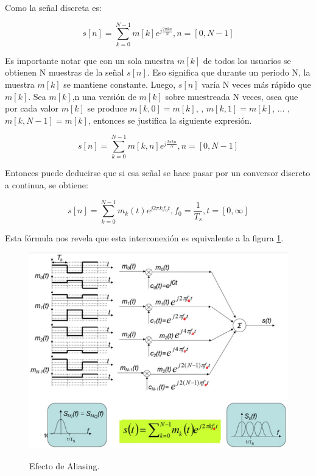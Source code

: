 Como la señal discreta es:

\begin{equation} \label{capseis_trece}
s[n]= \sum_{k=0}^{N-1}m[k]e^{j \frac{2 \pi kn}{N}} ,n=[0, N-1]
\end{equation}

Es importante notar que con un sola muestra $m[k]$ de todos los usuarios se obtienen N muestras de la señal $s[n]$. Eso significa que durante un periodo N, la muestra $m[k]$ se mantiene constante. Luego, $s[n]$ varía N veces más rápido que $m[k]$. Sea $m[k]$,n una versión de $m[k]$ sobre muestreada N veces, osea que por cada valor $m[k]$ se produce $m[k,0]=m[k]$, , $m[k,1]=m[k]$,  ... , $m[k,N-1]=m[k]$, entonces se justifica la siguiente expresión.

\begin{equation} \label{capseis_catorce}
s[n]= \sum_{k=0}^{N-1}m[k,n]e^{j \frac{2 \pi kn}{N}} ,n=[0, N-1]
\end{equation}

Entonces puede deducirse que si esa señal se hace pasar por un conversor discreto a continua, se obtiene:

\begin{equation} \label{capseis_quince}
s[n]= \sum_{k=0}^{N-1}m_{k}(t)e^{j2\pi kf_{0}t} , f_{0}= \frac{1}{T_{s}}, t= [0, \infty]
\end{equation}

Esta fórmula nos revela que esta interconexión es equivalente a la figura \ref{fig:Aliasing}.

\vspace{200px}
\begin{figure}[h!]
	\captionsetup{justification = raggedright, singlelinecheck = false}
	\caption{Efecto de Aliasing.} 
	\centering
	\includegraphics[scale=0.9]{Imagenes/Aliasing.png}
	\label{fig:Aliasing}
\end{figure}

